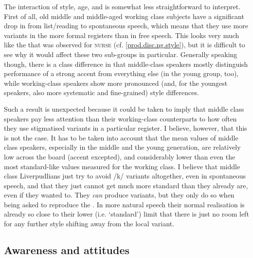 The interaction of style, age, and  is somewhat less straightforward to interpret.
First of all, old middle and middle-aged working class subjects have a significant drop in  from list/reading to spontaneous speech, which means that they use more  variants in the more formal registers than in free speech.
This looks very much like the  that was observed for \textsc{nurse} (cf. \ref{prod.disc.ng.style}), but it is difficult to see why it would affect these two sub-groups in particular.
Generally speaking though, there is a class difference in that middle-class speakers mostly distinguish performance of a strong accent from everything else (in the young group, too), while working-class speakers show more pronounced (and, for the youngest speakers, also more systematic and fine-grained) style differences.

Such a result is unexpected because it could be taken to imply that middle class speakers pay less attention than their working-class counterparts to how often they use stigmatised variants in a particular register.
I believe, however, that this is not the case.
It has to be taken into account that the mean  values of middle class speakers, especially in the middle and the young generation, are relatively low across the board (accent  excepted), and considerably lower than even the most standard-like values measured for the working class.
I believe that middle class Liverpudlians just try to avoid  /k/ variants altogether, even in spontaneous speech, and that they just cannot get much more standard than they already are, even if they wanted to.
They \emph{can} produce  variants, but they only do so when being asked to reproduce the .
In more natural speech their normal realisation is already so close to their lower (i.e. `standard') limit that there is just no room left for any further style shifting away from the local variant.

\subsection{Awareness and attitudes}
\label{prod.disc.k.aware}

